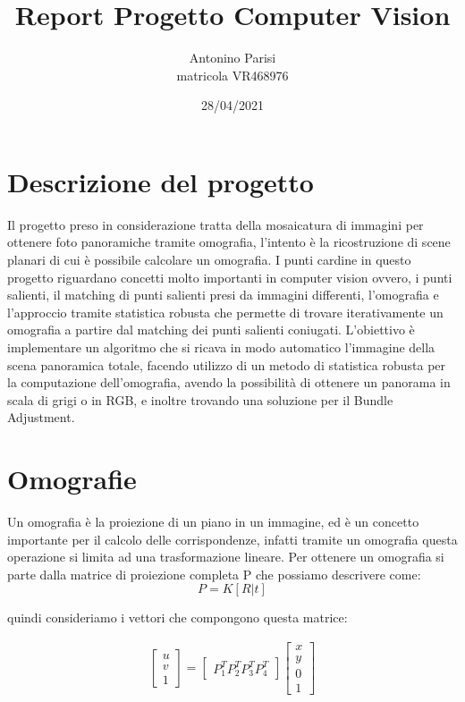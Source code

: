 \documentclass[11pt, oneside]{article}   	%
\title{Report Progetto Computer Vision}
\author{Antonino Parisi \\ matricola VR468976}
\date{28/04/2021}							%
\begin{document}
\maketitle

\pagebreak

\tableofcontents


\pagebreak
\section{Descrizione del progetto}
Il progetto preso in considerazione tratta della mosaicatura di immagini per ottenere foto panoramiche tramite omografia,
l'intento è la ricostruzione di scene planari di cui è possibile calcolare un omografia.
I punti cardine in questo progetto riguardano concetti molto importanti in computer vision ovvero, i punti salienti, il matching di punti salienti presi da immagini differenti, l'omografia e l'approccio tramite statistica robusta che permette di trovare iterativamente un omografia a partire dal matching dei punti salienti coniugati.
L'obiettivo è implementare un algoritmo che si ricava in modo automatico l'immagine della scena panoramica totale, facendo utilizzo di un metodo di statistica robusta per la computazione dell'omografia, avendo la possibilità di ottenere un panorama in scala di grigi o in RGB, e inoltre trovando una soluzione per il Bundle Adjustment.

\section{Omografie} 

Un omografia è la proiezione di un piano in un immagine, ed è un concetto importante per il calcolo delle corrispondenze,
infatti tramite un omografia questa operazione si limita ad una trasformazione lineare.
Per ottenere un omografia si parte dalla matrice di proiezione completa P che possiamo descrivere come: 
\begin{displaymath} P = K[R|t]\end{displaymath}


quindi consideriamo i vettori che compongono questa matrice:

\begin{align}
	\begin{bmatrix}
		u  \\
		v  \\
		1 
	\end{bmatrix}
	=
	\begin{bmatrix}
		P_1^T  P_2^T P_3^T P_4^T	
	\end{bmatrix}
	\begin{bmatrix}
		x  \\
		y  \\
		0 \\
		1
	\end{bmatrix}
\end{align}
\end{document}
